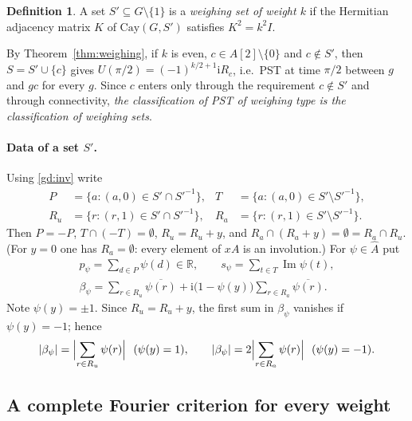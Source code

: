 \documentclass[preprint,11pt]{elsarticle}
\theoremstyle{definition}
\newtheorem{definition}[theorem]{Definition}
\theoremstyle{remark}
\newcommand{\ii}{\mathrm i}
\begin{document}
\begin{definition}\label{gd:def}
A set $S'\subseteq G\setminus\{1\}$ is a \emph{weighing set of weight $k$} if the Hermitian adjacency matrix $K$ of $\mathrm{Cay}(G,S')$ satisfies $K^2=k^2I$.
\end{definition}

By Theorem~\ref{thm:weighing}, if $k$ is even, $c\in A[2]\setminus\{0\}$ and $c\notin S'$, then $S=S'\cup\{c\}$ gives $U(\pi/2)=(-1)^{k/2+1}\ii R_c$, i.e.\ PST at time $\pi/2$ between $g$ and $gc$ for every $g$. Since $c$ enters only through the requirement $c\notin S'$ and through connectivity, \emph{the classification of PST of weighing type is the classification of weighing sets}.

\paragraph{Data of a set $S'$.} Using \eqref{gd:inv} write
\begin{align*}
P&=\{a:(a,0)\in S'\cap S'^{-1}\}, & T&=\{a:(a,0)\in S'\setminus S'^{-1}\},\\
R_u&=\{r:(r,1)\in S'\cap S'^{-1}\}, & R_a&=\{r:(r,1)\in S'\setminus S'^{-1}\}.
\end{align*}
Then $P=-P$, $T\cap(-T)=\emptyset$, $R_u=R_u+y$, and $R_a\cap(R_a+y)=\emptyset=R_a\cap R_u$. (For $y=0$ one has $R_a=\emptyset$: every element of $xA$ is an involution.) For $\psi\in\widehat A$ put
\begin{gather*}
p_\psi=\sum_{d\in P}\psi(d)\in\mathbb R,\qquad s_\psi=\sum_{t\in T}\operatorname{Im}\psi(t),\\
\beta_\psi=\sum_{r\in R_u}\overline{\psi(r)}+\ii\bigl(1-\psi(y)\bigr)\sum_{r\in R_a}\overline{\psi(r)} .
\end{gather*}
Note $\psi(y)=\pm1$. Since $R_u=R_u+y$, the first sum in $\beta_\psi$ vanishes if $\psi(y)=-1$; hence
\begin{equation}\label{gd:beta}
|\beta_\psi|=\Bigl|\sum_{r\in R_u}\psi(r)\Bigr|\ \ (\psi(y)=1),\qquad |\beta_\psi|=2\Bigl|\sum_{r\in R_a}\psi(r)\Bigr|\ \ (\psi(y)=-1).
\end{equation}

\subsection{A complete Fourier criterion for every weight}
\end{document}
